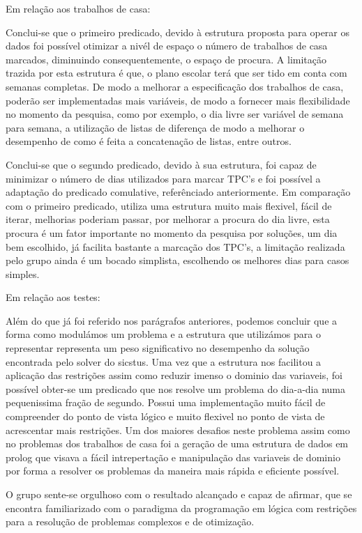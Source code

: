 \documentclass{llncs}
\begin{document}
Em relação aos trabalhos de casa:

Conclui-se que o primeiro predicado, devido à estrutura proposta para operar os dados foi possível otimizar a nivél de espaço o número de trabalhos de casa marcados, diminuindo consequentemente, o espaço de procura. A limitação trazida por esta estrutura é que, o plano escolar terá que ser tido em conta com semanas completas.  De modo a melhorar a especificação dos trabalhos de casa, poderão ser implementadas mais variáveis, de modo a fornecer mais flexibilidade no momento da pesquisa, como por exemplo, o dia livre ser variável de semana para semana, a utilização de listas de diferença de modo a melhorar o desempenho de como é feita a concatenação de listas, entre outros.

Conclui-se que o segundo predicado, devido à sua estrutura, foi capaz de minimizar o número de dias utilizados para marcar TPC's e foi possível a adaptação do predicado comulative, referênciado anteriormente. Em comparação com o primeiro predicado, utiliza uma estrutura muito mais flexivel, fácil de iterar, melhorias poderiam passar, por melhorar a procura do dia livre, esta procura é um fator importante no momento da pesquisa por soluções, um dia bem escolhido, já facilita bastante a marcação dos TPC's, a limitação realizada pelo grupo ainda é um bocado simplista, escolhendo os melhores dias para casos simples.

Em relação aos testes:

Além do que já foi referido nos parágrafos anteriores, podemos concluir que a forma como modulámos um problema e a estrutura que utilizámos para o representar representa um peso significativo no desempenho da solução encontrada pelo solver do sicstus. Uma vez que a estrutura nos facilitou a aplicação das restrições assim como reduzir imenso o dominio das variaveis, foi possível obter-se um predicado que nos resolve um problema do dia-a-dia numa pequenissima fração de segundo. Possui uma implementação muito fácil de compreender do ponto de vista lógico e muito flexivel no ponto de vista de acrescentar mais restrições. Um dos maiores desafios neste problema assim como no problemas dos trabalhos de casa foi a geração de uma estrutura de dados em prolog que visava a fácil intrepertação e manipulação das variaveis de dominio por forma a resolver os problemas da maneira mais rápida e eficiente possível.

O grupo sente-se orgulhoso com o resultado alcançado e capaz de afirmar, que se encontra familiarizado com o paradigma da programação em lógica com restrições para a resolução de problemas complexos e de otimização.
\end{document}
